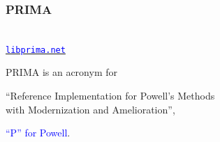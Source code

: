 \documentclass[slidestop,mathserif,xcolor=dvipsnames]{beamer}
\newcommand{\blue}[1]{\textcolor{blue}{#1}}
\newcommand{\red}[1]{\textcolor{red}{#1}}
\newtheorem*{mybox}{}
\begin{document}




\begin{frame}
    \frametitle{PRIMA}

    \begin{center}
    \\[1.6ex]\href{http://www.libprima.net}{\blue{\texttt{libprima.net}}}
    \end{center}
    \vspace{1ex}
    PRIMA is an acronym for
    \begin{center}
        ``Reference Implementation for Powell's Methods \\with Modernization and Amelioration'',
    \end{center}
    \blue{``P'' for Powell}.
\end{frame}
\end{document}
